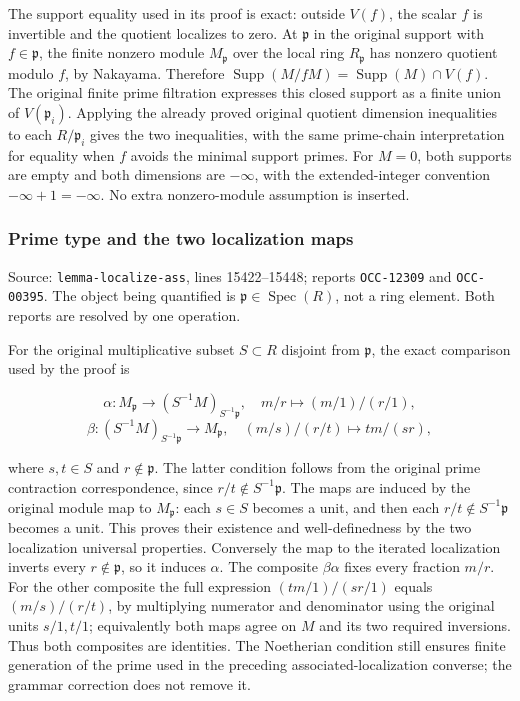 The support equality used in its proof is exact: outside \(V(f)\), the scalar \(f\) is invertible and the quotient localizes to zero. At \(\mathfrak p\) in the original support with \(f\in\mathfrak p\), the finite nonzero module \(M_{\mathfrak p}\) over the local ring \(R_{\mathfrak p}\) has nonzero quotient modulo \(f\), by Nakayama. Therefore \(\operatorname{Supp}(M/fM)=\operatorname{Supp}(M)\cap V(f)\). The original finite prime filtration expresses this closed support as a finite union of \(V(\mathfrak p_i)\). Applying the already proved original quotient dimension inequalities to each \(R/\mathfrak p_i\) gives the two inequalities, with the same prime-chain interpretation for equality when \(f\) avoids the minimal support primes. For \(M=0\), both supports are empty and both dimensions are \(-\infty\), with the extended-integer convention \(-\infty+1=-\infty\). No extra nonzero-module assumption is inserted.

\subsubsection{Prime type and the two localization maps}\label{algebra-proof-004-prime-type-and-the-two-localization-maps}

Source: \texttt{lemma-localize-ass}, lines 15422--15448; reports \texttt{OCC-12309} and \texttt{OCC-00395}. The object being quantified is \(\mathfrak p\in\operatorname{Spec}(R)\), not a ring element. Both reports are resolved by one operation.

For the original multiplicative subset \(S\subset R\) disjoint from \(\mathfrak p\), the exact comparison used by the proof is

\[
\alpha:M_{\mathfrak p}\longrightarrow(S^{-1}M)_{S^{-1}\mathfrak p},
\quad m/r\longmapsto(m/1)/(r/1),
\] \[
\beta:(S^{-1}M)_{S^{-1}\mathfrak p}\longrightarrow M_{\mathfrak p},
\quad (m/s)/(r/t)\longmapsto tm/(sr),
\]

where \(s,t\in S\) and \(r\notin\mathfrak p\). The latter condition follows from the original prime contraction correspondence, since \(r/t\notin S^{-1}\mathfrak p\). The maps are induced by the original module map to \(M_{\mathfrak p}\): each \(s\in S\) becomes a unit, and then each \(r/t\notin S^{-1}\mathfrak p\) becomes a unit. This proves their existence and well-definedness by the two localization universal properties. Conversely the map to the iterated localization inverts every \(r\notin\mathfrak p\), so it induces \(\alpha\). The composite \(\beta\alpha\) fixes every fraction \(m/r\). For the other composite the full expression \((tm/1)/(sr/1)\) equals \((m/s)/(r/t)\), by multiplying numerator and denominator using the original units \(s/1,t/1\); equivalently both maps agree on \(M\) and its two required inversions. Thus both composites are identities. The Noetherian condition still ensures finite generation of the prime used in the preceding associated-localization converse; the grammar correction does not remove it.

